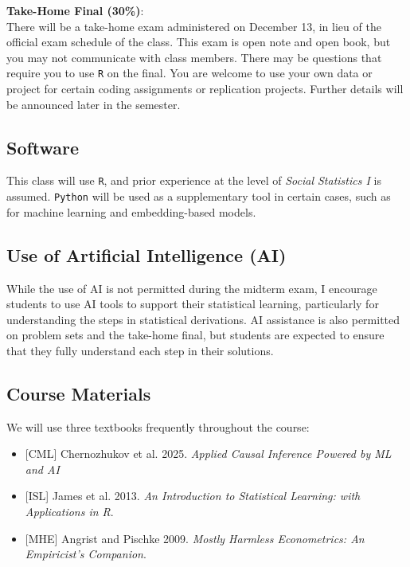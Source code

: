\documentclass[12pt]{article}
\begin{document}
\vspace{0.5em}

\noindent \textbf{\textcolor{titlecolor}{Take-Home Final (30\%)}}: \\
There will be a take-home exam administered on December 13, in lieu of the official exam schedule of the class. This exam is open note and open book, but you may not communicate with class members. There
may be questions that require you to use \texttt{R} on the final. You are welcome to use your own data or project for certain coding assignments or replication projects. Further details will be announced later in the semester.

\subsection*{Software}
This class will use \texttt{R}, and prior experience at the level of \textit{Social Statistics I} is assumed. \texttt{Python} will be used as a supplementary tool in certain cases, such as for machine learning and embedding-based models.

\subsection*{Use of Artificial Intelligence (AI)}
While the use of AI is not permitted during the midterm exam, I encourage students to use AI tools to support their statistical learning, particularly for understanding the steps in statistical derivations. AI assistance is also permitted on problem sets and the take-home final, but students are expected to ensure that they fully understand each step in their solutions.

\subsection*{Course Materials}

We will use three textbooks frequently throughout the course:
\begin{itemize}[noitemsep, topsep=2pt]
    \item \textcolor{titlecolor}{[CML]} Chernozhukov et al. 2025. \textit{Applied Causal Inference Powered by ML and AI}
    \item \textcolor{titlecolor}{[ISL]} James et al. 2013. \textit{An Introduction to Statistical Learning: with Applications in R}.
    \item \textcolor{titlecolor}{[MHE]} Angrist and Pischke 2009. \textit{Mostly Harmless Econometrics: An Empiricist's Companion}.
\end{itemize}
\end{document}

